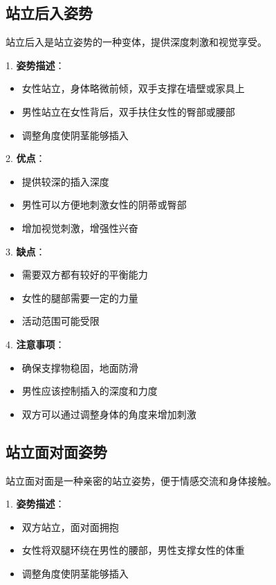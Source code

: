 \documentclass[12pt,UTF8]{ctexbook}
\begin{document}
\subsection{站立后入姿势}

站立后入是站立姿势的一种变体，提供深度刺激和视觉享受。

1. \textbf{姿势描述}：
  \begin{itemize}
  \item 女性站立，身体略微前倾，双手支撑在墙壁或家具上
  \item 男性站立在女性背后，双手扶住女性的臀部或腰部
  \item 调整角度使阴茎能够插入
  \end{itemize}

2. \textbf{优点}：
  \begin{itemize}
  \item 提供较深的插入深度
  \item 男性可以方便地刺激女性的阴蒂或臀部
  \item 增加视觉刺激，增强性兴奋
  \end{itemize}

3. \textbf{缺点}：
  \begin{itemize}
  \item 需要双方都有较好的平衡能力
  \item 女性的腿部需要一定的力量
  \item 活动范围可能受限
  \end{itemize}

4. \textbf{注意事项}：
  \begin{itemize}
  \item 确保支撑物稳固，地面防滑
  \item 男性应该控制插入的深度和力度
  \item 双方可以通过调整身体的角度来增加刺激
  \end{itemize}

\subsection{站立面对面姿势}

站立面对面是一种亲密的站立姿势，便于情感交流和身体接触。

1. \textbf{姿势描述}：
  \begin{itemize}
  \item 双方站立，面对面拥抱
  \item 女性将双腿环绕在男性的腰部，男性支撑女性的体重
  \item 调整角度使阴茎能够插入
  \end{itemize}
\end{document}
